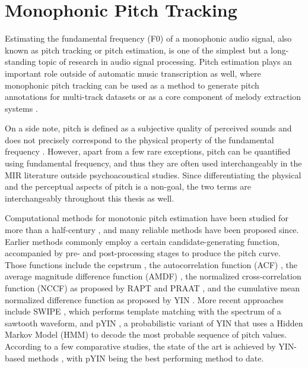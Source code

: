 \section{Monophonic Pitch Tracking}\label{sec:monophonic}

Estimating the fundamental frequency (F0) of a monophonic audio signal, also known as pitch tracking or pitch estimation, is one of the simplest but a long-standing topic of research in audio signal processing.
Pitch estimation plays an important role outside of automatic music transcription as well, where monophonic pitch tracking can be used as a method to generate pitch annotations for multi-track datasets \cite{bittner2014medleydb} or as a core component of melody extraction systems \cite{bosch2014melody, mauch2015computer}.

On a side note, pitch is defined as a subjective quality of perceived sounds and does not precisely correspond to the physical property of the fundamental frequency \cite{hartmann1997signals}.
However, apart from a few rare exceptions, pitch can be quantified using fundamental frequency, and thus they are often used interchangeably in the MIR literature outside psychoacoustical studies. 
Since differentiating the physical and the perceptual aspects of pitch is a non-goal, the two terms are interchangeably throughout this thesis as well.

Computational methods for monotonic pitch estimation have been studied for more than a half-century \cite{noll1967cepstrum}, and many reliable methods have been proposed since.
Earlier methods commonly employ a certain candidate-generating function, accompanied by pre- and post-processing stages to produce the pitch curve.
Those functions include the cepstrum \cite{noll1967cepstrum}, the autocorrelation function (ACF) \cite{dubnowski1976acf}, the average magnitude difference function (AMDF) \cite{ross1974amdf}, the normalized cross-correlation function (NCCF) as proposed by RAPT \cite{talkin1995rapt} and PRAAT \cite{boersma1993praat}, and the cumulative mean normalized difference function as proposed by YIN \cite{decheveigne2002yin}. More recent approaches include SWIPE \cite{camacho2008swipe}, which performs template matching with the spectrum of a sawtooth waveform, and 
pYIN \cite{mauch2014pyin}, a probabilistic variant of YIN that uses a Hidden Markov Model (HMM) to decode the most probable sequence of pitch values.
According to a few comparative studies, the state of the art is achieved by YIN-based methods \cite{von2010comparison, babacan2013comparative}, with pYIN being the best performing method to date.

